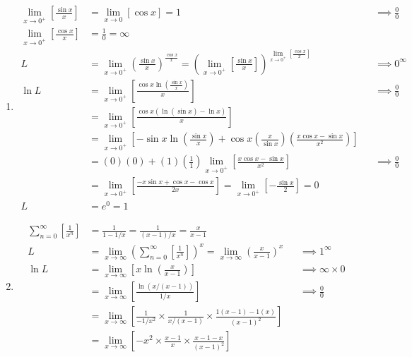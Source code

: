 \documentclass[12pt, A4]{report}
\begin{document}
\begin{enumerate}
				\item
					\begin{align*}
						\lim_{x\to 0^+}\left[\frac{\sin x}{x}\right] &= \lim_{x\to 0}\left[\cos x\right] = 1 
								&&\implies \frac{0}{0} \\
						\lim_{x\to 0^+}\left[\frac{\cos x}{x}\right] &= \frac{1}{0} = \infty \\
						L &= \lim_{x\to 0^+}\left(\frac{\sin x}{x}\right)^\frac{\cos x}{x}
								= \left(\lim_{x\to 0^+}\left[\frac{\sin x}{x}\right]\right)^{\lim_{x\to 0^+}\left[\frac{\cos x}{x}\right]}
								&&\implies 0^\infty \\
						\ln L &= \lim_{x\to 0^+}\left[\frac{\cos x\ln\left(\frac{\sin x}{x}\right)}{x}\right]
								&&\implies \frac{0}{0} \\
							&= \lim_{x\to 0^+}\left[\frac{\cos x(\ln(\sin x) - \ln x)}{x}\right] \\
							&= \lim_{x\to 0^+}\left[-\sin x\ln\left(\frac{\sin x}{x}\right) + \cos x\left(\frac{x}{\sin x}\right)\left(\frac{x\cos x - \sin x}{x^2}\right)\right] \\
							&= (0)(0) + (1)\left(\frac{1}{1}\right)\lim_{x\to 0^+}\left[\frac{x\cos x - \sin x}{x^2}\right] 
								&&\implies \frac{0}{0} \\
							&= \lim_{x\to 0^+}\left[\frac{-x\sin x + \cos x - \cos x}{2x}\right]
								= \lim_{x\to 0^+}\left[-\frac{\sin x}{2}\right] = 0 \\
						L &= e^0
								= 1
					\end{align*}
				\item
					\begin{align*}
						\sum_{n = 0}^{\infty}\left[\frac{1}{x^n}\right] &= \frac{1}{1 - 1/x}
									= \frac{1}{(x - 1)/x}
									= \frac{x}{x - 1} \\
						L &= \lim_{x\to\infty}\left(\sum_{n = 0}^\infty\left[\frac{1}{x^n}\right]\right)^{x} = \lim_{x\to\infty}\left(\frac{x}{x - 1}\right)^x
								&&\implies 1^\infty \\
						\ln L &= \lim_{x\to\infty}\left[x\ln\left(\frac{x}{x - 1}\right)\right]
								&&\implies \infty \times 0 \\
							&= \lim_{x\to\infty}\left[\frac{\ln(x/(x - 1))}{1/x}\right]
								&&\implies \frac{0}{0} \\
							&= \lim_{x\to\infty}\left[\frac{1}{-1/x^2} \times \frac{1}{x/(x - 1)} \times \frac{1(x - 1) - 1(x)}{(x - 1)^2}\right] \\
							&= \lim_{x\to\infty}\left[-x^2 \times \frac{x - 1}{x} \times \frac{x - 1 - x}{(x - 1)^2}\right]

\end{align*}
\end{enumerate}
\end{document}
